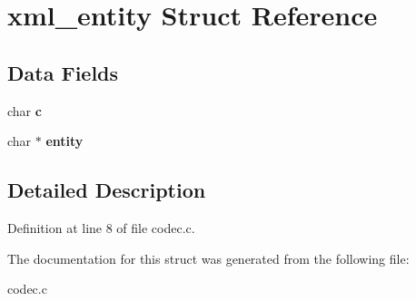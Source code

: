 \hypertarget{structxml__entity}{
\section{xml\_\-entity Struct Reference}
\label{structxml__entity}
}
\subsection*{Data Fields}
\begin{DoxyCompactItemize}
\item 
\hypertarget{structxml__entity_aeceafcf6254ece2ad2ef854bc18b4c7a}{
char {\bfseries c}}
\label{structxml__entity_aeceafcf6254ece2ad2ef854bc18b4c7a}

\item 
\hypertarget{structxml__entity_a2870c5eb523e83d8599edf8adf9bc42f}{
char $\ast$ {\bfseries entity}}
\label{structxml__entity_a2870c5eb523e83d8599edf8adf9bc42f}

\end{DoxyCompactItemize}


\subsection{Detailed Description}


Definition at line 8 of file codec.c.



The documentation for this struct was generated from the following file:\begin{DoxyCompactItemize}
\item 
codec.c\end{DoxyCompactItemize}
